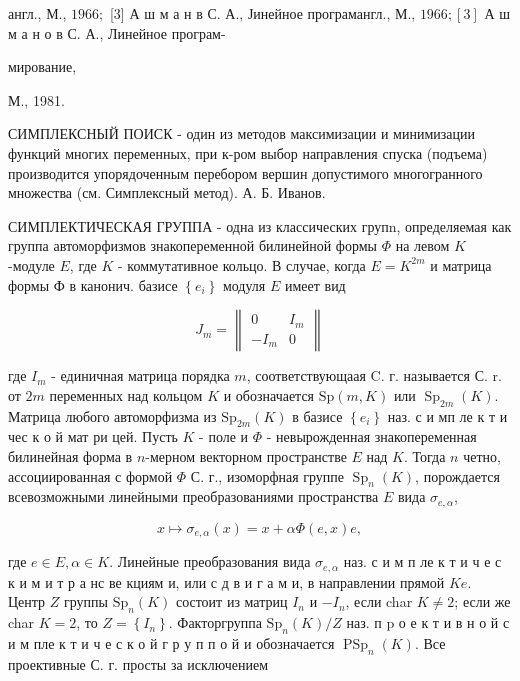 \documentclass[10pt]{article}
\begin{document}
англ., М., $1966 ;$ [3] А ш м а н в С. А., Јинейное програмангл., М., $1966 ;[3]$ А ш м а н о в С. А., Линейное програм-

мирование,

М., 1981.



СИМПЛЕКСНЫЙ ПОИСК - один из методов максимизации и минимизации функций многих переменных, при к-ром выбор направления спуска (подъема) производится упорядоченным перебором вершин допустимого многогранного множества (см. Симплексный метод). А. Б. Иванов.



СИМПЛЕКТИЧЕСКАЯ ГРУППА - одна из классических групn, определяемая как группа автоморфизмов знакопеременной билинейной формы $\Phi$ на левом $K$-модуле $E$, где $K$ - коммутативное кольцо. В случае, когда $E=K^{2 m}$ и матрица формы Ф в канонич. базисе $\left\{e_{i}\right\}$ модуля $E$ имеет вид



\[

J_{m}=\left\|\begin{array}{cc}

0 & I_{m} \\

-I_{m} & 0

\end{array}\right\|

\]



где $I_{m}$ - единичная матрица порядка $m$, соответствующаая C. г. называется С. r. от $2 m$ переменных над кольцом $K$ и обозначается $\mathrm{Sp}(m, K)$ или $\operatorname{Sp}_{2 m}(K)$. Матрица любого автоморфизма из $\mathrm{Sp}_{2 m}(K)$ в базисе $\left\{e_{i}\right\}$ наз. с и мп ле к т и чес к о й мат ри цей. Пусть $K$ - поле и $\Phi$ - невырожденная знакопеременная билинейная форма в $n$-мерном векторном пространстве $E$ над $K$. Тогда $n$ четно, ассоциированная с формой $\Phi$ С. г., изоморфная группе $\operatorname{Sp}_{n}(K)$, порождается всевозможными линейными преобразованиями пространства $E$ вида $\sigma_{e, \alpha}$,



\[

x \mapsto \sigma_{e, \alpha}(x)=x+\alpha \Phi(e, x) e,

\]



где $e \in E, \alpha \in K$. Линейные преобразования вида $\sigma_{e, \alpha}$ наз. с и м п ле к т и ч е с к и м и т р а нс ве кциям и, или с д в и г а м и, в направлении прямой $K e$. Центр $Z$ группы $\mathrm{Sp}_{n}(K)$ состоит из матриц $I_{n}$ и $-I_{n}$, если char $K \neq 2$; если же char $K=2$, то $Z=\left\{I_{n}\right\}$. Факторгруппа $\mathrm{Sp}_{n}(K) / Z$ наз. п $\mathrm{p}$ о е к т и в н о й с и м пле к т и ч е с к о й г р у п п о й и обозначается $\operatorname{PSp}_{n}(K)$. Все проективные С. г. просты за исключением
\end{document}
